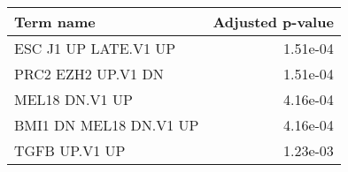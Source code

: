 \begin{tabular}{lr}
\toprule
              Term name &  Adjusted p-value \\
\midrule
   ESC J1 UP LATE.V1 UP &          1.51e-04 \\
     PRC2 EZH2 UP.V1 DN &          1.51e-04 \\
         MEL18 DN.V1 UP &          4.16e-04 \\
 BMI1 DN MEL18 DN.V1 UP &          4.16e-04 \\
          TGFB UP.V1 UP &          1.23e-03 \\
\bottomrule
\end{tabular}
